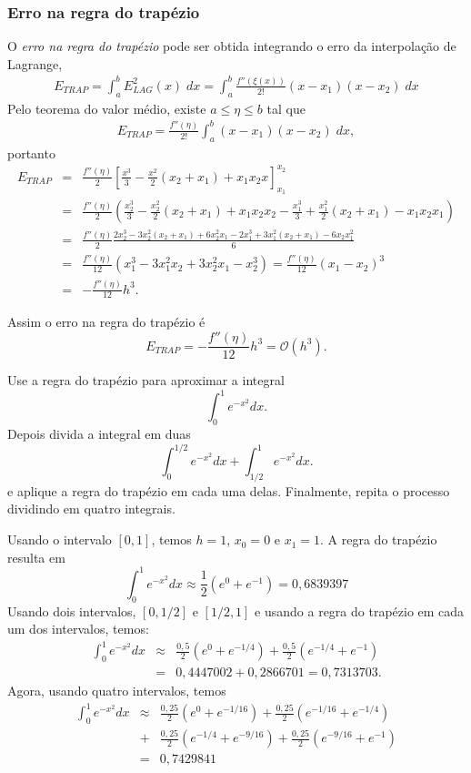 \subsubsection{Erro na regra do trapézio}
O \textit{erro na regra do trapézio} pode ser obtida integrando o erro da interpolação de Lagrange,
\begin{eqnarray*}
   E_{TRAP} = \int_a^b E^2_{LAG}(x) \;dx= \int_a^b \frac{f''(\xi(x))}{2!}(x-x_1)(x-x_2) \;dx
\end{eqnarray*}
Pelo teorema do valor médio, existe $a\leq \eta\leq b$ tal que
\begin{eqnarray*}
    E_{TRAP} = \frac{f''(\eta)}{2!}\int_a^b (x-x_1)(x-x_2) \;dx,
\end{eqnarray*}
portanto
\begin{eqnarray*}
     E_{TRAP}
  &=& \frac{f''(\eta)}{2}\left[\frac{x^3}{3}-\frac{x^2}{2}(x_2+x_1)+x_1x_2x\right]_{x_1}^{x_2}\\
  &=& \frac{f''(\eta)}{2}\left(\frac{x_2^3}{3}-\frac{x_2^2}{2}(x_2+x_1)+x_1x_2x_2-\frac{x_1^3}{3}+\frac{x_1^2}{2}(x_2+x_1)-x_1x_2x_1\right)\\
  &=& \frac{f''(\eta)}{2}\frac{2x_2^3-3x_2^2(x_2+x_1)+6x_2^2x_1-2x_1^3+3x_1^2(x_2+x_1)-6x_2x_1^2}{6}\\
  &=& \frac{f''(\eta)}{12}\left(x_1^3-3x_1^2x_2+3x_2^2x_1-x_2^3\right) 
   =  \frac{f''(\eta)}{12}(x_1-x_2)^3\\
  &=& -\frac{f''(\eta)}{12}h^3.
\end{eqnarray*}

Assim o erro na regra do trapézio é 
$$
E_{TRAP}  = -\frac{f''(\eta)}{12}h^3 = \mathcal{O}(h^3).
$$

\begin{ex}
Use a regra do trapézio para aproximar a integral
$$
\int_0^1e^{-x^2}dx.
$$
Depois divida a integral em duas
$$
\int_0^{1/2}e^{-x^2}dx+\int_{1/2}^{1}e^{-x^2}dx.
$$
e aplique a regra do trapézio em cada uma delas. Finalmente, repita o processo dividindo em quatro integrais.
\end{ex}
Usando o intervalo $[0,1]$, temos $h=1$, $x_0=0$ e $x_1=1$. A regra do trapézio resulta em
$$
\int_0^1e^{-x^2}dx\approx \frac{1}{2}(e^{0}+e^{-1})=0,6839397
$$
Usando dois intervalos, $[0,1/2]$ e $[1/2,1]$ e usando a regra do trapézio em cada um dos intervalos, temos:
\begin{eqnarray*}
\int_0^1e^{-x^2}dx &\approx& \frac{0,5}{2}\left(e^{0}+e^{-1/4}\right) + \frac{0,5}{2}\left(e^{-1/4}+e^{-1}\right) \\
&=& 0,4447002+0,2866701 =0,7313703.
\end{eqnarray*}
Agora, usando quatro intervalos, temos
\begin{eqnarray*}
\int_0^1e^{-x^2}dx &\approx& \frac{0,25}{2}\left(e^{0}+e^{-1/16}\right) + \frac{0,25}{2}\left(e^{-1/16}+e^{-1/4}\right) \\
&+& \frac{0,25}{2}\left(e^{-1/4}+e^{-9/16}\right)+\frac{0,25}{2}\left(e^{-9/16}+e^{-1}\right) \\
&=& 0,7429841
\end{eqnarray*}



